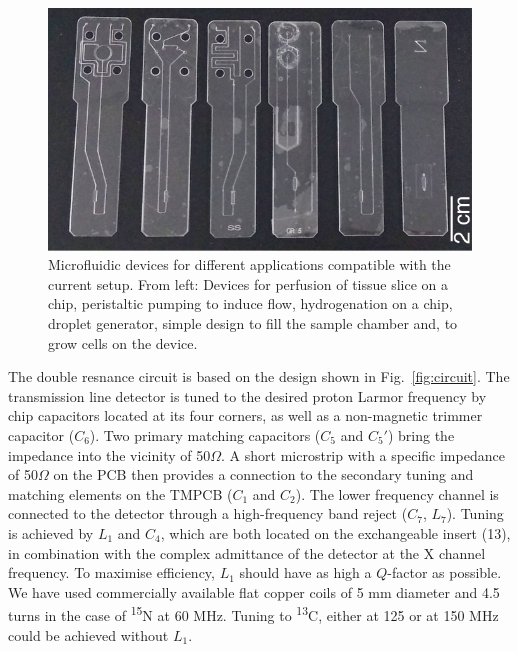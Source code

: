 \documentclass[preprint,5p]{elsarticle}
\newcommand{\fig}[1]{Fig.~\ref{#1}}
\begin{document}
\begin{figure}
\centering
\includegraphics[width=.7\linewidth,keepaspectratio=true]{./figures/ms5n17-tlp-im-181007-devices.png}
\caption{Microfluidic devices for different applications compatible with the current setup.
From left: Devices for perfusion of tissue slice on a chip, peristaltic pumping to induce flow,
hydrogenation on a chip, droplet generator, simple design to fill the sample chamber and,
to grow cells on the device.}
\label{fig:device}
\end{figure}

The double resnance circuit is based on the design shown in \fig{fig:circuit}.
The transmission line detector is tuned to the desired proton
Larmor frequency by chip capacitors located at its four corners,
as well as a non-magnetic trimmer capacitor ($C_6$). Two primary
matching capacitors ($C_5$ and $C_5'$) bring the impedance into the
vicinity of 50$\Omega$. A short microstrip
with a specific impedance of 50$\Omega$
on the PCB then provides a connection to the secondary tuning and matching elements on the TMPCB ($C_1$ and $C_2$).
The lower frequency channel is connected to the detector through a high-frequency band reject ($C_7$, $L_7$).
Tuning is achieved by $L_1$ and $C_4$, which are both located on the exchangeable insert (13), in combination with
the complex admittance of the detector at the X channel frequency.
To maximise efficiency, $L_1$ should have as high a $Q$-factor as possible. We have
used commercially available flat copper coils of 5 mm diameter and 4.5 turns in the case of
\textsuperscript{15}N at 60 MHz. Tuning to \textsuperscript{13}C, either at 125 or at 150 MHz
could be achieved without $L_1$.
\end{document}

